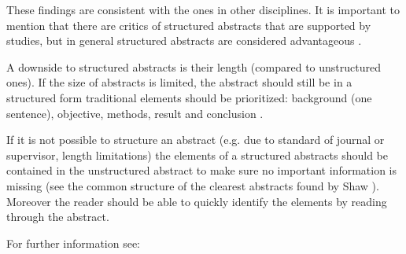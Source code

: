 These findings are consistent with the ones in other disciplines. It is important to mention that there are critics of structured abstracts that are supported by studies, but in general structured abstracts are considered advantageous \cite{hartley2004,hartley2014}.	

A downside to structured abstracts is their length (compared to unstructured ones). If the size of abstracts is limited, the abstract should still be in a structured form traditional elements should be prioritized: background (one sentence), objective, methods, result and conclusion \cite{Jedlitschka2008}.

If it is not possible to structure an abstract (e.g. due to standard of journal or supervisor, length limitations) the elements of a structured abstracts should be contained in the unstructured abstract to make sure no important information is missing (see the common structure of the clearest abstracts found by Shaw \cite{shaw2003}). Moreover the reader should be able to quickly identify the elements by reading through the abstract.

For further information see:  \cite{Andrade2011}
